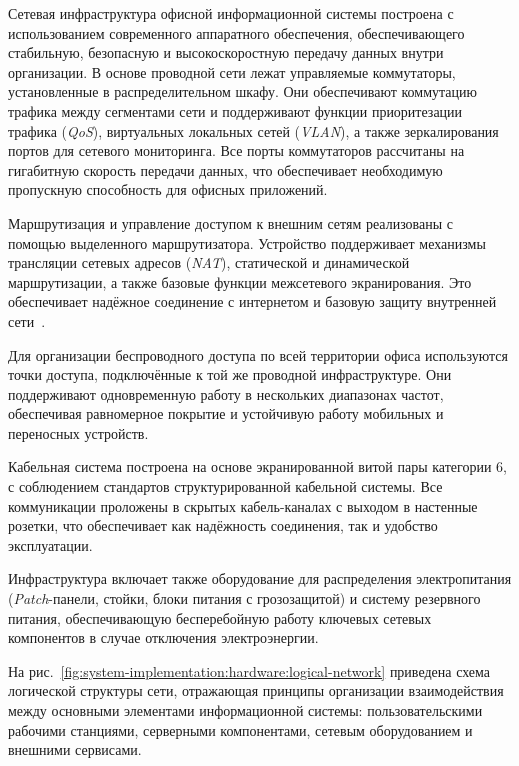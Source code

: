 Сетевая инфраструктура офисной информационной системы построена с использованием современного аппаратного обеспечения, обеспечивающего стабильную, безопасную и высокоскоростную передачу данных внутри организации. В основе проводной сети лежат управляемые коммутаторы, установленные в распределительном шкафу. Они обеспечивают коммутацию трафика между сегментами сети и поддерживают функции приоритезации трафика (\textit{QoS}), виртуальных локальных сетей (\textit{VLAN}), а также зеркалирования портов для сетевого мониторинга. Все порты коммутаторов рассчитаны на гигабитную скорость передачи данных, что обеспечивает необходимую пропускную способность для офисных приложений.

Маршрутизация и управление доступом к внешним сетям реализованы с помощью выделенного маршрутизатора. Устройство поддерживает механизмы трансляции сетевых адресов (\textit{NAT}), статической и динамической маршрутизации, а также базовые функции межсетевого экранирования. Это обеспечивает надёжное соединение с интернетом и базовую защиту внутренней сети~\cite{book_tanenbaum_computer_networks}.

Для организации беспроводного доступа по всей территории офиса используются точки доступа, подключённые к той же проводной инфраструктуре. Они поддерживают одновременную работу в нескольких диапазонах частот, обеспечивая равномерное покрытие и устойчивую работу мобильных и переносных устройств.

Кабельная система построена на основе экранированной витой пары категории 6, с соблюдением стандартов структурированной кабельной системы. Все коммуникации проложены в скрытых кабель-каналах с выходом в настенные розетки, что обеспечивает как надёжность соединения, так и удобство эксплуатации.

Инфраструктура включает также оборудование для распределения электропитания (\textit{Patch}-панели, стойки, блоки питания с грозозащитой) и систему резервного питания, обеспечивающую бесперебойную работу ключевых сетевых компонентов в случае отключения электроэнергии.

На рис.~\ref{fig:system-implementation:hardware:logical-network} приведена схема логической структуры сети, отражающая принципы организации взаимодействия между основными элементами информационной системы: пользовательскими рабочими станциями, серверными компонентами, сетевым оборудованием и внешними сервисами. 

